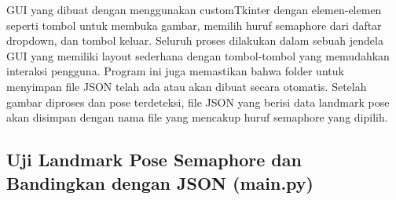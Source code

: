 \documentclass[a4paper,12pt]{article}
\begin{document}
GUI yang dibuat dengan menggunakan customTkinter dengan elemen-elemen seperti tombol untuk membuka gambar, memilih huruf semaphore dari daftar dropdown, dan tombol keluar. Seluruh proses dilakukan dalam sebuah jendela GUI yang memiliki layout sederhana dengan tombol-tombol yang memudahkan interaksi pengguna. Program ini juga memastikan bahwa folder untuk menyimpan file JSON telah ada atau akan dibuat secara otomatis. Setelah gambar diproses dan pose terdeteksi, file JSON yang berisi data landmark pose akan disimpan dengan nama file yang mencakup huruf semaphore yang dipilih.

\subsection{Uji Landmark Pose Semaphore dan Bandingkan dengan JSON (main.py)}
\end{document}
